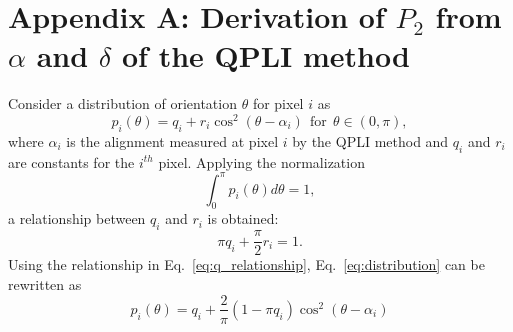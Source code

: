 \documentclass[]{interact}
\begin{document}



\appendix
\section*{Appendix A: Derivation of $P_2$ from $\alpha$ and $\delta$ of the QPLI method}
\label{app:P2_derivation}

Consider a distribution of orientation $\theta$ for pixel $i$ as 
%
\begin{equation}
p_i(\theta) = q_i + r_i\cos^2(\theta - \alpha_i) \ \ \text{for} \ \ \theta \in (0,\pi),
\label{eq:distribution}
\end{equation}
%
where $\alpha_i$ is the alignment measured at pixel $i$ by the QPLI method and $q_i$ and $r_i$ are constants for the $i^{th}$ pixel. Applying the normalization 
%
\begin{equation}
\int_0^{\pi}p_i(\theta)d\theta = 1,
\end{equation}
%
a relationship between $q_i$ and $r_i$ is obtained:
%
\begin{equation}
\pi q_i + \frac{\pi}{2}r_i = 1.
\label{eq:q_relationship}
\end{equation}
%
Using the relationship in Eq.\ \eqref{eq:q_relationship}, Eq.\ \eqref{eq:distribution} can be rewritten as
%
\begin{equation}
p_i(\theta) = q_i + \frac{2}{\pi}(1-\pi q_i)\cos^2(\theta-\alpha_i)
\label{eq:distribution_q}
\end{equation}
%
\end{document}
